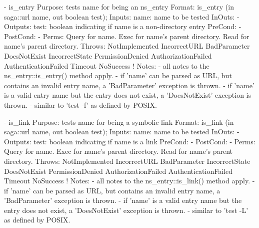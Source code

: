 \begin{myspec}
 
    - is_entry
      Purpose:  tests name for being an ns_entry
      Format:   is_entry           (in  saga::url name,
                                    out boolean   test);
      Inputs:   name:               name to be tested
      InOuts:   -
      Outputs:  test:               boolean indicating if name
                                    is a non-directory entry
      PreCond:  -
      PostCond: -
      Perms:    Query for name.
                Exec  for name's parent directory.
                Read  for name's parent directory.
      Throws:   NotImplemented
                IncorrectURL
                BadParameter
                DoesNotExist
                IncorrectState
                PermissionDenied
                AuthorizationFailed
                AuthenticationFailed
                Timeout
                NoSuccess
!     Notes:    - all notes to the ns_entry::is_entry() method 
                  apply.
                - if 'name' can be parsed as URL, but contains 
                  an invalid entry name, a 'BadParameter'
                  exception is thrown.
                - if 'name' is a valid entry name but the entry
                  does not exist, a 'DoesNotExist' exception is
                  thrown.
                - similar to 'test -f' as defined by POSIX.
 
 
    - is_link
      Purpose:  tests name for being a symbolic link
      Format:   is_link            (in  saga::url name,
                                    out boolean   test);
      Inputs:   name:               name to be tested
      InOuts:   -
      Outputs:  test:               boolean indicating if name
                                    is a link
      PreCond:  -
      PostCond: -
      Perms:    Query for name.
                Exec  for name's parent directory.
                Read  for name's parent directory.
      Throws:   NotImplemented
                IncorrectURL
                BadParameter
                IncorrectState
                DoesNotExist
                PermissionDenied
                AuthorizationFailed
                AuthenticationFailed
                Timeout
                NoSuccess
!     Notes:    - all notes to the ns_entry::is_link() method 
                  apply.
                - if 'name' can be parsed as URL, but contains 
                  an invalid entry name, a 'BadParameter'
                  exception is thrown.
                - if 'name' is a valid entry name but the entry
                  does not exist, a 'DoesNotExist' exception is
                  thrown.
                - similar to 'test -L' as defined by POSIX.
 

\end{myspec}
